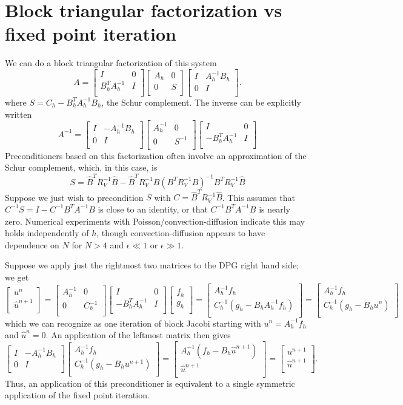 \documentclass{article}
\newcommand{\LRp}[1]{\left( #1 \right)}
\newcommand{\LRs}[1]{\left[ #1 \right]}
\newcommand{\uh}{\widehat{u}}
\def\arr#1#2#3#4{\left[
\begin{array}{cc}
#1 & #2\\
#3 & #4\\
\end{array}
\right]}
\def\vecttwo#1#2{\left[
\begin{array}{c}
#1\\
#2\\
\end{array}
\right]}
\begin{document}
\section{Block triangular factorization vs fixed point iteration}

We can do a block triangular factorization of this system 
\[
A = \arr{I}{0}{B_h^TA_h^{-1}}{I}\arr{A_h}{0}{0}{S}\arr{I}{A_h^{-1}B_h}{0}{I}.
\]
where $S = C_h - B_h^TA_h^{-1}B_h$, the Schur complement.  The inverse can be explicitly written
\[
A^{-1} = \arr{I}{-A_h^{-1}B_h}{0}{I}\arr{A_h^{-1}}{0}{0}{S^{-1}}\arr{I}{0}{-B_h^TA_h^{-1}}{I}
\]
Preconditioners based on this factorization often involve an approximation of the Schur complement, which, in this case, is
\[
S = \hat{B}^TR_V^{-1}\hat{B} - \hat{B}^TR_V^{-1}{B}\LRp{B^TR_V^{-1}B}^{-1} B^TR_V^{-1}\hat{B}
\]
Suppose we just wish to precondition $S$ with $C = \hat{B}^TR_V^{-1}\hat{B}$.  This assumes that $C^{-1}S = I - C^{-1}B^TA^{-1}B$ is close to an identity, or that $C^{-1}B^TA^{-1}B$ is nearly zero.  Numerical experiments with Poisson/convection-diffusion indicate this may holds independently of $h$, though convection-diffusion appears to have dependence on $N$ for $N>4$ and $\epsilon \ll 1$ or $\epsilon \gg 1$.  

Suppose we apply just the rightmost two matrices to the DPG right hand side; we get
\[
\vecttwo{u^{n}}{\uh^{n+1}} = \arr{A_h^{-1}}{0}{0}{C_h^{-1}}\arr{I}{0}{-B_h^TA_h^{-1}}{I}\vecttwo{f_h}{g_h} = \vecttwo{A_h^{-1}f_h }{C_h^{-1}(g_h - B_hA_h^{-1}f_h)}= \vecttwo{A_h^{-1}f_h }{C_h^{-1}(g_h - B_hu^{n})}
\]
which we can recognize as one iteration of block Jacobi starting with $u^{n} = A_h^{-1}f_h$ and $\uh^n = 0$.  An application of the leftmost matrix then gives
\[
\arr{I}{-A_h^{-1}B_h}{0}{I}\vecttwo{A_h^{-1}f_h }{C_h^{-1}(g_h - B_hu^{n+1})} = \vecttwo{A_h^{-1}(f_h - B_h \uh^{n+1})}{\uh^{n+1}} = \vecttwo{u^{n+1}}{\uh^{n+1}}.
\]
Thus, an application of this preconditioner is equivalent to a single symmetric application of the fixed point iteration.  
\end{document}

